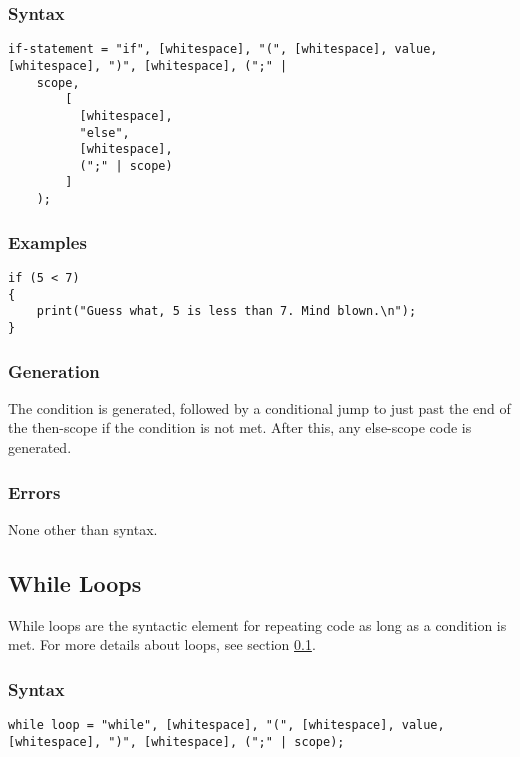 \documentclass[10pt,a4paper]{article}
\begin{document}
\subsubsection{Syntax}
\begin{verbatim}
if-statement = "if", [whitespace], "(", [whitespace], value, [whitespace], ")", [whitespace], (";" |
    scope,
        [
          [whitespace],
          "else", 
          [whitespace],
          (";" | scope)
        ]
    );
\end{verbatim}

\subsubsection{Examples}
\begin{verbatim}
if (5 < 7)
{
    print("Guess what, 5 is less than 7. Mind blown.\n");
}
\end{verbatim}

\subsubsection{Generation}
The condition is generated, followed by a conditional jump to just past the end of the then-scope if the condition is not met. After this, any else-scope code is generated.

\subsubsection{Errors}
None other than syntax.

\newpage





\subsection{While Loops}
\label{sec:WhileLoops}
While loops are the syntactic element for repeating code as long as a condition is met. For more details about loops, see section \ref{sec:WhileLoops}.

\subsubsection{Syntax}
\begin{verbatim}
while loop = "while", [whitespace], "(", [whitespace], value, [whitespace], ")", [whitespace], (";" | scope);
\end{verbatim}
\end{document}
